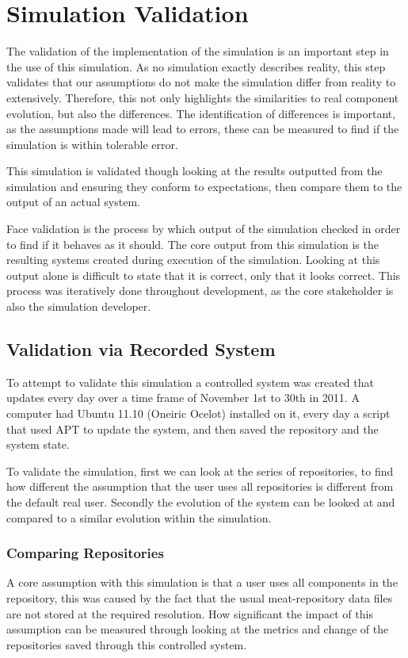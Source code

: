 \section{Simulation Validation}
The validation of the implementation of the simulation is an important step in the use of this simulation.
As no simulation exactly describes reality, this step validates that our assumptions do not make the simulation differ from reality to extensively.
Therefore, this not only highlights the similarities to real component evolution, but also the differences.
The identification of differences is important, as the assumptions made will lead to errors, these can be measured to find if the simulation is within tolerable error. 

This simulation is validated though looking at the results outputted from the simulation and ensuring they conform to expectations, 
then compare them to the output of an actual system.

Face validation is the process by which output of the simulation checked in order to find if it behaves as it should.
The core output from this simulation is the resulting systems created during execution of the simulation.
Looking at this output alone is difficult to state that it is correct, only that it looks correct.
This process was iteratively done throughout development, as the core stakeholder is also the simulation developer.

\subsection{Validation via Recorded System}
To attempt to validate this simulation a controlled system was created that updates every day over a time frame of November 1st to 30th in 2011.
A computer had Ubuntu 11.10 (Oneiric Ocelot) installed on it, every day a script that used APT to update the system, and then saved the repository and the system state.

To validate the simulation, first we can look at the series of repositories, to find how different the assumption that the user uses all repositories is different from the default real user.
Secondly the evolution of the system can be looked at and compared to a similar evolution within the simulation.

\subsubsection{Comparing Repositories}
A core assumption with this simulation is that a user uses all components in the repository, 
this was caused by the fact that the usual meat-repository data files are not stored at the required resolution.
How significant the impact of this assumption can be measured through looking at the metrics and change of the repositories saved through this controlled system.

